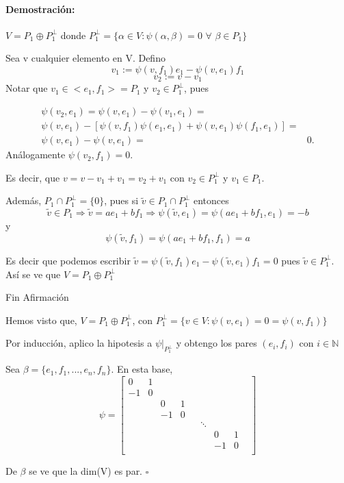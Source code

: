 \documentclass[12pt]{article}
\newenvironment{proof}{\paragraph{Demostración:}}{\hfill$\square$}
\begin{document}
\begin{proof}
 $V = P_1 \oplus P_1^{\bot}$
 donde $P_1^{\bot}= \{ \alpha \in V: \psi(\alpha,\beta)=0$  $\forall$  $\beta \in P_1 \} $ 
 
 
 Sea v cualquier elemento en V.
 Defino 
 $$v_1:=\psi(v,f_1)e_1-\psi(v,e_1)f_1$$
 $$v_2:=v-v_1$$
 Notar que $v_1 \in <e_1,f_1>=P_1$ y $v_2 \in P_1^{\bot}$, pues 
 
 $$\begin{aligned}
 \psi(v_2,e_1)=\psi(v,e_1)-\psi(v_1,e_1)=&\\
 \psi (v,e_1)-[\psi(v,f_1) \psi(e_1,e_1) + \psi(v,e_1) \psi(f_1,e_1)]=&\\
 \psi(v,e_1)- \psi(v,e_1)=&0.
 \end{aligned}$$
 Análogamente $\psi(v_2,f_1)=0$.
 
 Es decir, que $v=v-v_1+v_1=v_2 + v_1$ con $v_2 \in P_1^{\bot}$ y $v_1 \in P_1$.
 
 Además, $P_1  \cap P_1^{\bot} = \{0\}$, pues si  $\tilde{v} \in  P_1 \cap P_1^{\bot}$ entonces
 $$
 \tilde{v} \in P_1 \Rightarrow \tilde{v}=a e_1 + b f_1 \Rightarrow 
 \psi(\tilde{v},e_1)=\psi(a e_1 + b f_1,e_1)=-b$$ y $$\psi(\tilde{v},f_1)=\psi(a e_1 + b f_1,f_1)=a 
 $$
 
 
 Es decir que podemos escribir $\tilde{v}=\psi(\tilde{v},f_1) e_1 - \psi(\tilde{v},e_1) f_1=0$ pues 
 $\tilde{v} \in P_1^{\bot}.$
 Así se ve que $V = P_1 \oplus P_1^{\bot}$ 

 Fin Afirmación
\newline

Hemos visto que, $V=P_1 \oplus P_1^{\bot}$, con $P_1^{\bot}=\{v \in V : \psi(v,e_1)=0=\psi(v,f_1)\}$

Por inducción, aplico la hipotesis a $\psi|_{P_1^{\bot}}$ y obtengo los pares $(e_i,f_i)$ con $i \in \mathbb{N}$

Sea $\beta=\{e_1,f_1,...,e_n,f_n\}$.
En esta base, 
$$\psi = 
\begin{bmatrix}
 0 & 1 & & & & & & &\\ 
 -1& 0 & & & & & & &\\
 & & 0 & 1 & & & & &\\
 & & -1 & 0 & & & & &\\
 & &  &  & & \ddots & & &\\
 & &  &  & & & 0 & 1 &\\
 & &  &  & & & -1 & 0 &\\ 
\end{bmatrix}
$$

De $\beta$ se ve que la dim(V) es par. 
\end{proof}
\end{document}
